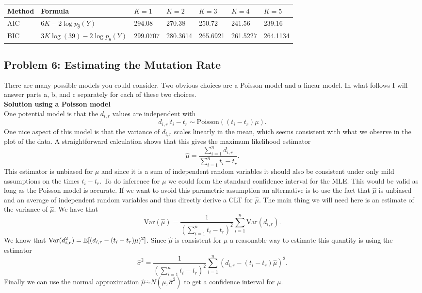 \begin{center}
\begin{tabular}{|| l l l l l l l ||} 
 \hline
 Method & Formula & $K=1$ & $K=2$ & $K=3$  & $K=4$ & $K=5$ \\ [0.5ex] 
 \hline
AIC & $6K-2 \log p_{\hat{\theta}}(Y)$ & 294.08 & 270.38 & 250.72  & 241.56 & 239.16 \\
 \hline
 BIC & $3K \log(39)-2 \log p_{\hat{\theta}}(Y)$ & 299.0707 & 280.3614 & 265.6921  & 261.5227 & 264.1134 \\
 \hline
\end{tabular}
\end{center}

\subsection*{Problem 6: Estimating the Mutation Rate}

There are many possible models you could consider. Two obvious choices are a Poisson model and a linear model. In what follows I will answer parts a, b, and c separately for each of these two choices. \\

\noindent \textbf{Solution using a Poisson model}\\

\noindent One potential model is that the $d_{i,r}$ values are independent with 
\[
d_{i,r}|t_i - t_r \sim \text{Poisson}((t_i-t_r)\mu).
\]
One nice aspect of this model is that the variance of $d_{i,r}$ scales linearly in the mean, which seems consistent with what we observe in the plot of the data.  A straightforward calculation shows that this gives the maximum likelihood estimator 
\[
\hat{\mu} = \frac{\sum_{i=1}^n d_{i,r}}{\sum_{i=1}^n t_i - t_r}.
\]
This estimator is unbiased for $\mu$ and since it is a sum of independent random variables it should also be consistent under only mild assumptions on the times $t_i - t_r$. To do inference for $\mu$ we could form the standard confidence interval for the MLE. This would be valid as long as the Poisson model is accurate. If we want to avoid this parametric assumption an alternative is to use the fact that $\hat{\mu}$ is unbiased and an average of independent random variables and thus directly derive a CLT for $\hat{\mu}$. The main thing we will need here is an estimate of the variance of $\hat{\mu}$. We have that 
\[
\text{Var}(\hat{\mu}) = \frac{1}{(\sum_{i=1}^n t_i - t_r)^2} \sum_{i=1}^n \text{Var}(d_{i,r}).
\]
We know that $\text{Var}(d_{i,r}^2) = \mathbb{E}[(d_{i,r} - (t_i-t_r)\mu)^2]$. Since $\hat{\mu}$ is consistent for $\mu$ a reasonable way to estimate this quantity is using the estimator
\[
\hat{\sigma}^2 =  \frac{1}{(\sum_{i=1}^n t_i - t_r)^2}  \sum_{i=1}^n (d_{i,r} - (t_i - t_r)\hat{\mu})^2.
\]
Finally we can use the normal approximation $\hat{\mu} \stackrel{\cdot}{\sim} N(\mu,\hat{\sigma}^2)$ to get a confidence interval for $\mu$.

